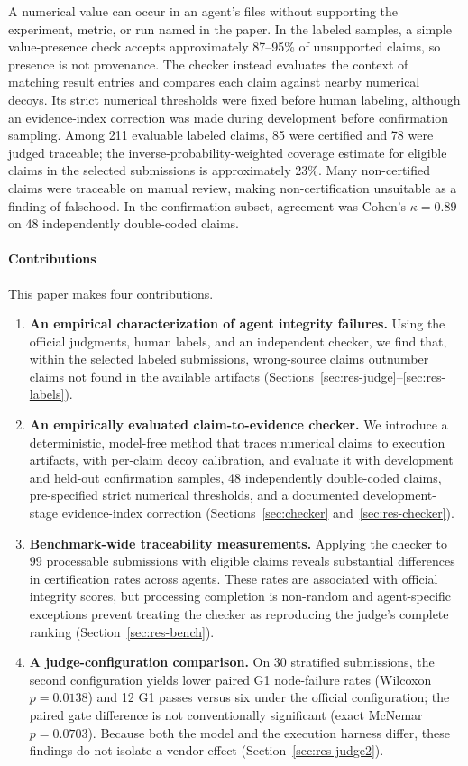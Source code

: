 \documentclass[preprint,12pt,authoryear]{elsarticle}
\begin{document}
A numerical value can occur in an agent's files without supporting the experiment, metric, or run named in the paper. In the labeled samples, a simple value-presence check accepts approximately 87--95\% of unsupported claims, so presence is not provenance. The checker instead evaluates the context of matching result entries and compares each claim against nearby numerical decoys. Its strict numerical thresholds were fixed before human labeling, although an evidence-index correction was made during development before confirmation sampling. Among 211 evaluable labeled claims, 85 were certified and 78 were judged traceable; the inverse-probability-weighted coverage estimate for eligible claims in the selected submissions is approximately 23\%. Many non-certified claims were traceable on manual review, making non-certification unsuitable as a finding of falsehood. In the confirmation subset, agreement was Cohen's $\kappa=0.89$ on 48 independently double-coded claims.

\paragraph{Contributions} This paper makes four contributions.
\begin{enumerate}
  \item \textbf{An empirical characterization of agent integrity failures.} Using the official judgments, human labels, and an independent checker, we find that, within the selected labeled submissions, wrong-source claims outnumber claims not found in the available artifacts (Sections~\ref{sec:res-judge}--\ref{sec:res-labels}).
  \item \textbf{An empirically evaluated claim-to-evidence checker.} We introduce a deterministic, model-free method that traces numerical claims to execution artifacts, with per-claim decoy calibration, and evaluate it with development and held-out confirmation samples, 48 independently double-coded claims, pre-specified strict numerical thresholds, and a documented development-stage evidence-index correction (Sections~\ref{sec:checker} and~\ref{sec:res-checker}).
  \item \textbf{Benchmark-wide traceability measurements.} Applying the checker to 99 processable submissions with eligible claims reveals substantial differences in certification rates across agents. These rates are associated with official integrity scores, but processing completion is non-random and agent-specific exceptions prevent treating the checker as reproducing the judge's complete ranking (Section~\ref{sec:res-bench}).
  \item \textbf{A judge-configuration comparison.} On 30 stratified submissions, the second configuration yields lower paired G1 node-failure rates (Wilcoxon $p=0.0138$) and 12 G1 passes versus six under the official configuration; the paired gate difference is not conventionally significant (exact McNemar $p=0.0703$). Because both the model and the execution harness differ, these findings do not isolate a vendor effect (Section~\ref{sec:res-judge2}).
\end{enumerate}
\end{document}
